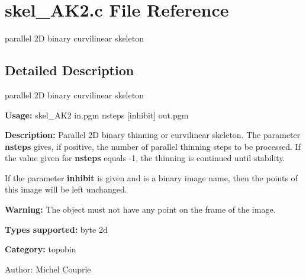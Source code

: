\section{skel\_\-AK2.c File Reference}
\label{skel__AK2_8c}
parallel 2D binary curvilinear skeleton  




\label{_details}
\subsection{Detailed Description}
parallel 2D binary curvilinear skeleton 

{\bf Usage:} skel\_\-AK2 in.pgm nsteps [inhibit] out.pgm

{\bf Description:} Parallel 2D binary thinning or curvilinear skeleton. The parameter {\bf nsteps} gives, if positive, the number of parallel thinning steps to be processed. If the value given for {\bf nsteps} equals -1, the thinning is continued until stability.

If the parameter {\bf inhibit} is given and is a binary image name, then the points of this image will be left unchanged.

{\bf Warning:} The object must not have any point on the frame of the image.

{\bf Types supported:} byte 2d

{\bf Category:} topobin

\begin{Desc}
\item[Author:]Michel Couprie \end{Desc}
